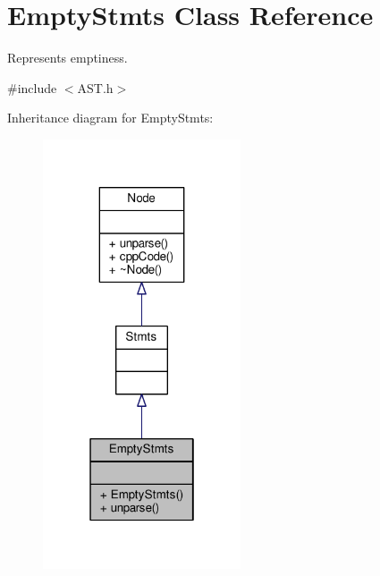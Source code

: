 \hypertarget{classEmptyStmts}{\section{Empty\-Stmts Class Reference}
\label{classEmptyStmts}
}


Represents emptiness.  




{\ttfamily \#include $<$A\-S\-T.\-h$>$}



Inheritance diagram for Empty\-Stmts\-:\nopagebreak
\begin{figure}[H]
\begin{center}
\leavevmode
\includegraphics[width=166pt]{classEmptyStmts__inherit__graph}
\end{center}
\end{figure}


